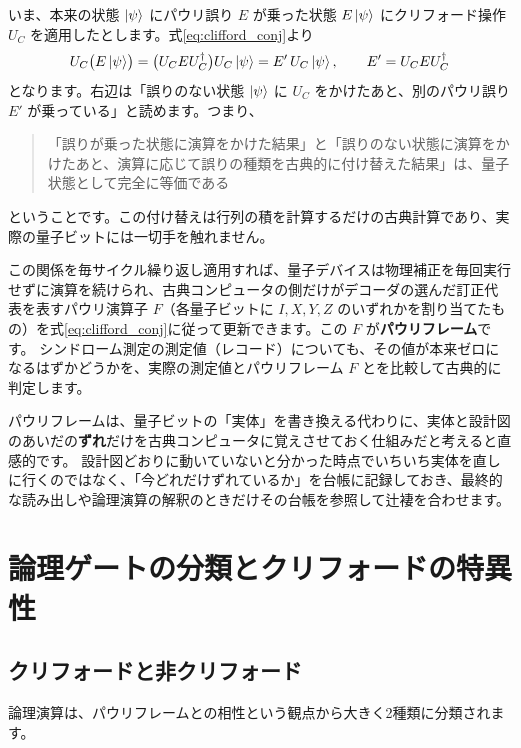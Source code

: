 いま、本来の状態 $\ket\psi$ にパウリ誤り $E$ が乗った状態 $E\ket\psi$ にクリフォード操作 $U_C$ を適用したとします。式\eqref{eq:clifford_conj}より
\begin{equation}
  U_C \bigl(E\ket\psi\bigr)
  = \bigl(U_C E U_C^\dagger\bigr) U_C \ket\psi
  = E' \, U_C\ket\psi, \qquad E' = U_C E U_C^\dagger
\end{equation}
となります。右辺は「誤りのない状態 $\ket\psi$ に $U_C$ をかけたあと、別のパウリ誤り $E'$ が乗っている」と読めます。つまり、

\begin{quote}
  「誤りが乗った状態に演算をかけた結果」と「誤りのない状態に演算をかけたあと、演算に応じて誤りの種類を古典的に付け替えた結果」は、量子状態として完全に等価である
\end{quote}

ということです。この付け替えは行列の積を計算するだけの古典計算であり、実際の量子ビットには一切手を触れません。

この関係を毎サイクル繰り返し適用すれば、量子デバイスは物理補正を毎回実行せずに演算を続けられ、古典コンピュータの側だけがデコーダの選んだ訂正代表を表すパウリ演算子 $F$（各量子ビットに $I,X,Y,Z$ のいずれかを割り当てたもの）を式\eqref{eq:clifford_conj}に従って更新できます。この $F$ が\textbf{パウリフレーム}です。
シンドローム測定の測定値（レコード）についても、その値が本来ゼロになるはずかどうかを、実際の測定値とパウリフレーム $F$ とを比較して古典的に判定します。

\begin{notebox}
  パウリフレームは、量子ビットの「実体」を書き換える代わりに、実体と設計図のあいだの\textbf{ずれ}だけを古典コンピュータに覚えさせておく仕組みだと考えると直感的です。
  設計図どおりに動いていないと分かった時点でいちいち実体を直しに行くのではなく、「今どれだけずれているか」を台帳に記録しておき、最終的な読み出しや論理演算の解釈のときだけその台帳を参照して辻褄を合わせます。
\end{notebox}

\section{論理ゲートの分類とクリフォードの特異性}\label{sec:gate_classification}

\subsection{クリフォードと非クリフォード}

論理演算は、パウリフレームとの相性という観点から大きく2種類に分類されます。

